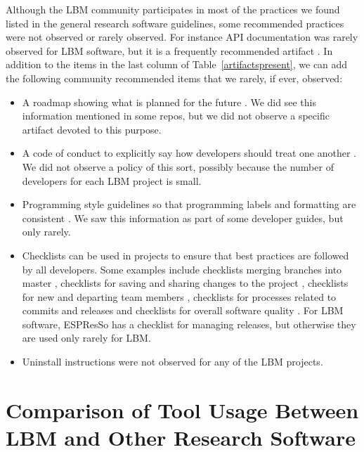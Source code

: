 \documentclass[runningheads]{llncs}
\begin{document}
Although the LBM community participates in most of the practices we found listed
in the general research software guidelines, some recommended practices were not
observed or rarely observed. For instance API documentation was rarely observed
for LBM software, but it is a frequently recommended artifact
\cite{SmithAndRoscoe2018,ThielEtAl2020,vanGompelEtAl2016,OrvizEtAl2017,SSI2022,Zadka2018}.
In addition to the items in the last column of Table~\ref{artifactspresent}, we
can add the following community recommended items that we rarely, if ever,
observed:

\begin{itemize}
\item A roadmap showing what is planned for the future
\cite{Yo2021,ThielEtAl2020,vanGompelEtAl2016}.  We did see this information
mentioned in some repos, but we did not observe a specific artifact devoted to
this purpose.
\item A code of conduct to explicitly say how developers should treat one
another \cite{Yo2021,ThielEtAl2020}.  We did not observe a policy of this
sort, possibly because the number of developers for each LBM project is small.
\item Programming style guidelines so that programming labels and formatting are
consistent \cite{TobiasEtAl2018,ThielEtAl2020,OrvizEtAl2017,Zadka2018,vanGompelEtAl2016,WilsonEtAl2014}.  We saw this information as part of
some developer guides, but only rarely.
\item Checklists can be used in projects to ensure that best practices are
followed by all developers.  Some examples include checklists merging branches
into master \cite{Brown2015}, checklists for saving and sharing changes to the
project \cite{WilsonEtAl2016}, checklists for new and departing team members
\cite{HerouxAndBernholdt2018}, checklists for processes related to commits and
releases \cite{HerouxEtAl2008} and checklists for overall software quality
\cite{ThielEtAl2020,SSI2022}.  For LBM software, ESPResSo has a checklist for
managing releases, but otherwise they are used only rarely for LBM.
\item Uninstall instructions \cite{vanGompelEtAl2016} were not observed for any
of the LBM projects.
\end{itemize}

\section{Comparison of Tool Usage Between LBM and Other Research Software}
\label{Sec_CompareTools}
\end{document}
